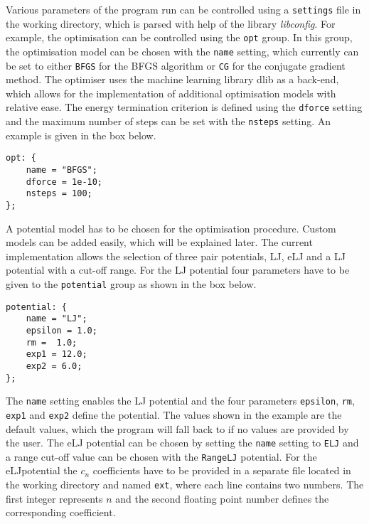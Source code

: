 Various parameters of the program run can be controlled using a
\texttt{settings} file in the working directory, which is parsed with help of
the library
\textit{libconfig}.\autocite{Lindner_libconfiglibraryprocessing_2018} For
example, the optimisation can be controlled using the \texttt{opt} group. In
this group, the optimisation model can be chosen with the \texttt{name} setting,
which currently can be set to either \texttt{BFGS} for the \acf{BFGS} algorithm
or \texttt{CG} for the conjugate gradient method. The optimiser uses the machine
learning library dlib\autocite{King_DlibmlMachineLearning_2009} as a back-end,
which allows for the implementation of additional optimisation models with
relative ease. The energy termination criterion is defined using the
\texttt{dforce} setting and the maximum number of steps can be set with the
\texttt{nsteps} setting. An example is given in the box below.
%
\begin{Verbatim}[frame=single,label=settings file - opt tag]
opt: {
    name = "BFGS";
    dforce = 1e-10;
    nsteps = 100;
};
\end{Verbatim}
%
A potential model has to be chosen for the optimisation procedure. Custom models
can be added easily, which will be explained later. The current implementation
allows the selection of three pair potentials, \ac{LJ}, \ac{eLJ} and a \ac{LJ}
potential with a cut-off range. For the \ac{LJ} potential four parameters have
to be given to the \texttt{potential} group as shown in the box below.
%
\begin{Verbatim}[frame=single,label=settings file - potential tag]
potential: {
    name = "LJ";
    epsilon = 1.0;
    rm =  1.0;
    exp1 = 12.0;
    exp2 = 6.0;
};
\end{Verbatim}
%
The \texttt{name} setting enables the \ac{LJ} potential and the four parameters
\texttt{epsilon}, \texttt{rm}, \texttt{exp1} and \texttt{exp2} define the
potential. The values shown in the example are the default values, which the
program will fall back to if no values are provided by the user. The \ac{eLJ}
potential can be chosen by setting the \texttt{name} setting to \texttt{ELJ} and
a range cut-off value can be chosen with the \texttt{RangeLJ} potential. For the
\ac{eLJ}potential the $c_n$ coefficients have to be provided in a separate file
located in the working directory and named \texttt{ext}, where each line
contains two numbers. The first integer represents $n$ and the second floating
point number defines the corresponding coefficient.

